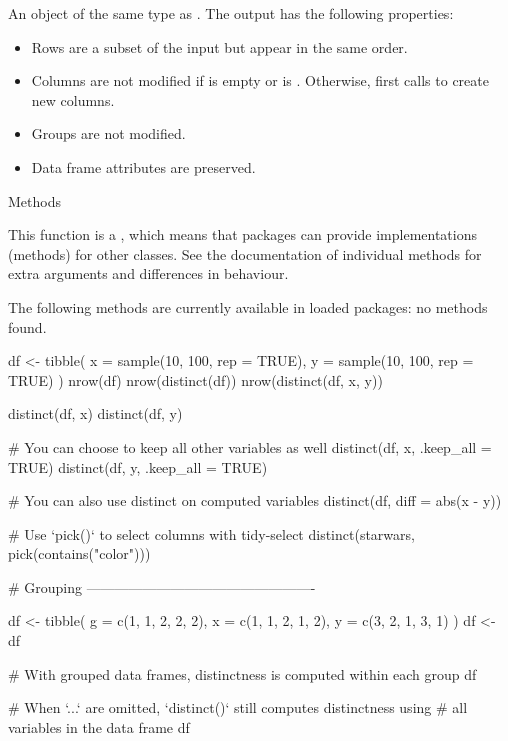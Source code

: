 \documentclass[a4paper]{book}
\begin{document}
%
\begin{Value}
An object of the same type as . The output has the following
properties:
\begin{itemize}

\item{} Rows are a subset of the input but appear in the same order.
\item{} Columns are not modified if  is empty or  is .
Otherwise,  first calls  to create new columns.
\item{} Groups are not modified.
\item{} Data frame attributes are preserved.

\end{itemize}

\end{Value}
%
\begin{Section}{Methods}

This function is a , which means that packages can provide
implementations (methods) for other classes. See the documentation of
individual methods for extra arguments and differences in behaviour.

The following methods are currently available in loaded packages:
no methods found.
\end{Section}
%
\begin{Examples}
\begin{ExampleCode}
df <- tibble(
  x = sample(10, 100, rep = TRUE),
  y = sample(10, 100, rep = TRUE)
)
nrow(df)
nrow(distinct(df))
nrow(distinct(df, x, y))

distinct(df, x)
distinct(df, y)

# You can choose to keep all other variables as well
distinct(df, x, .keep_all = TRUE)
distinct(df, y, .keep_all = TRUE)

# You can also use distinct on computed variables
distinct(df, diff = abs(x - y))

# Use `pick()` to select columns with tidy-select
distinct(starwars, pick(contains("color")))

# Grouping -------------------------------------------------

df <- tibble(
  g = c(1, 1, 2, 2, 2),
  x = c(1, 1, 2, 1, 2),
  y = c(3, 2, 1, 3, 1)
)
df <- df %

# With grouped data frames, distinctness is computed within each group
df %

# When `...` are omitted, `distinct()` still computes distinctness using
# all variables in the data frame
df %
\end{ExampleCode}
\end{Examples}
\end{document}
